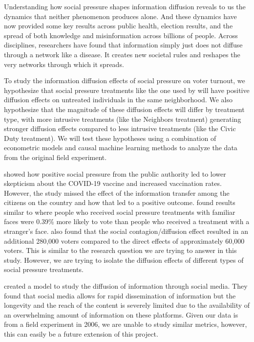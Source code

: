 \documentclass[11pt]{article}
\begin{document}
Understanding how social pressure shapes information diffusion reveals to us the dynamics that neither phenomenon produces alone. And these dynamics have now provided some key results across public health, election results, and the spread of both knowledge and misinformation across billions of people. Across disciplines, researchers have found that information simply just does not diffuse through a network like a disease. It creates new societal rules and reshapes the very networks through which it spreads. 

To study the information diffusion effects of social pressure on voter turnout, we hypothesize that social pressure treatments like the one used by \cite{gerber_social_2008} will have positive diffusion effects on untreated individuals in the same neighborhood. We also hypothesize that the magnitude of these diffusion effects will differ by treatment type, with more intrusive treatments (like the Neighbors treatment) generating stronger diffusion effects compared to less intrusive treatments (like the Civic Duty treatment). We will test these hypotheses using a combination of econometric models and causal machine learning methods to analyze the data from the original field experiment.

\cite{hong_covid-19_2023} showed how positive social pressure from the public authority led to lower skepticism about the COVID-19 vaccine and increased vaccination rates. However, the study missed the effect of the information transfer among the citizens on the country and how that led to a positive outcome. \cite{bond_61-million-person_2012} found results similar to \cite{gerber_social_2008} where people who received social pressure treatments with familiar faces were 0.39\% more likely to vote than people who received a treatment with a stranger's face. \cite{bond_61-million-person_2012} also found that the social contagion/diffusion effect resulted in an additional 280,000 voters compared to the direct effects of approximately 60,000 voters. This is similar to the research question we are trying to answer in this study. However, we are trying to isolate the diffusion effects of different types of social pressure treatments.

\cite{atienza-barthelemy_modeling_2025} created a model to study the diffusion of information through social media. They found that social media allows for rapid dissemination of information but the longevity and the reach of the content is severely limited due to the availability of an overwhelming amount of information on these platforms. Given our data is from a field experiment in 2006, we are unable to study similar metrics, however, this can easily be a future extension of this project.
\end{document}
